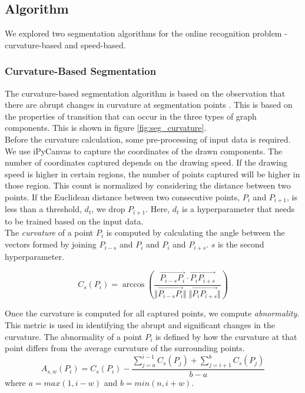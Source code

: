\subsection{Algorithm}
We explored two segmentation algorithms for the online recognition problem - curvature-based and speed-based.

\subsubsection{Curvature-Based Segmentation}
The curvature-based segmentation algorithm is based on the observation that there are abrupt changes in curvature at segmentation points \cite{daly2015hand}. This is based on the properties of transition that can occur in the three types of graph components. This is shown in figure \ref{fig:seg_curvature}.\\

Before the curvature calculation, some pre-processing of input data is required. We use iPyCanvas \cite{ipycanvas} to capture the coordinates of the drawn components. The number of coordinates captured depends on the drawing speed. If the drawing speed is higher in certain regions, the number of points captured will be higher in those region. This count is normalized by considering the distance between two points. If the Euclidean distance between two consecutive points, $P_i$ and $P_{i+1}$, is less than a threshold, $d_t$, we drop $P_{i+1}$. Here, $d_t$ is a hyperparameter that needs to be trained based on the input data.\\

The \textit{curvature} of a point $P_i$ is computed by calculating the angle between the vectors formed by joining $P_{i-s}$ and $P_i$ and $P_i$ and $P_{i+s}$. $s$ is the second hyperparameter.

\begin{equation}
	C_s(P_i) = \arccos \left(  \frac{\overrightarrow{P_{i-s} P_i} \cdot \overrightarrow{P_i P_{i+s}}}{ \Vert \overrightarrow{P_{i-s} P_i}  \Vert \; \Vert \overrightarrow{P_i P_{i+s}} \Vert  } \right) 
\end{equation} 

Once the curvature is computed for all captured points, we compute \textit{abnormality}. This metric is used in identifying the abrupt and significant changes in the curvature. The abnormality of a point $P_i$ is defined by how the curvature at that point differs from the average curvature of the surrounding points.
\begin{equation}
	A_{s,w}(P_i) = C_s(P_i) - \frac{\sum_{j=a}^{i-1} C_s(P_j) + \sum_{j=i+1}^{b} C_s(P_j)}{b - a}
\end{equation}
where $a = max(1, i-w)$ and $b = min(n, i+w)$.\\

